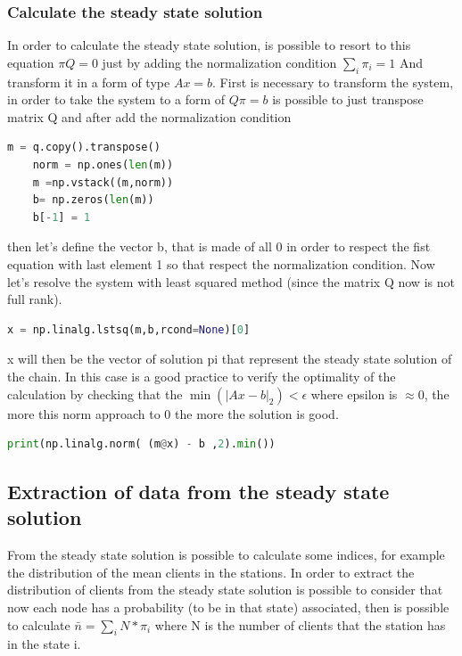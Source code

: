 \documentclass[12pt,a4paper]{article}
\begin{document}
\subsubsection{Calculate the steady state solution}

In order to calculate the steady state solution, is possible to resort to this equation $\pi Q=0$  just by adding the normalization condition $\sum_i \pi_i = 1$ And transform it in a form of type $Ax=b$. First is necessary to transform the system, in order to take the system to a form of $Q \pi=b$ is possible to just transpose matrix Q and after add the normalization condition

\begin{lstlisting}[language=python]
    m = q.copy().transpose()
    norm = np.ones(len(m))
    m =np.vstack((m,norm))
    b= np.zeros(len(m))
    b[-1] = 1
\end{lstlisting}

then let's define the vector b, that is made of all 0 in order to respect the fist equation with last element 1 so that respect the normalization condition. Now let's resolve the system with least squared method (since the matrix Q now is not full rank).

\begin{lstlisting}[language=python]
    x = np.linalg.lstsq(m,b,rcond=None)[0]
\end{lstlisting}

x will then be the vector of solution pi that represent the steady state solution of the chain. In this case is a good practice to verify the optimality of the calculation by checking that the $\min(|Ax-b|_2 )< \epsilon$ where epsilon is $\approx 0$, the more this norm approach to 0 the more the solution is good.

\begin{lstlisting}[language = python]
    print(np.linalg.norm( (m@x) - b ,2).min())
\end{lstlisting}
\subsection{Extraction of data from the steady state solution}

From the steady state solution is possible to calculate some indices, for example the distribution of the mean clients in the stations. In order to extract the distribution of clients from the steady state solution is possible to consider that now each node has a probability (to be in that state) associated, then is possible to calculate $\bar{n}=\sum_{i}N * \pi_i$ where N is the number of clients that the station has in the state i.
\end{document}
